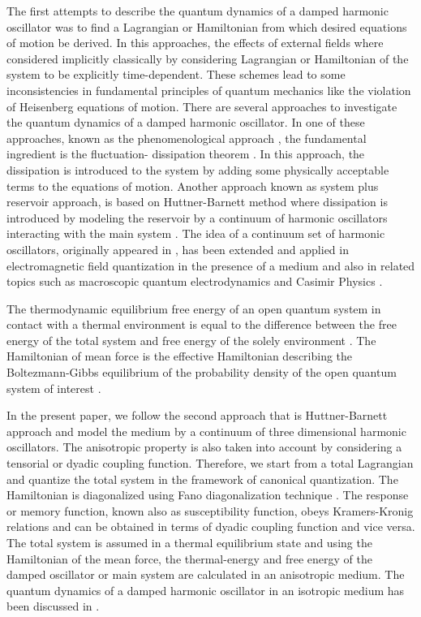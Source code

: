 \documentclass[preprint,showpacs,showkeys,groupedaddress,superscriptaddress]{revtex4}
\begin{document}
The first attempts to describe the quantum dynamics of a damped harmonic oscillator was to find a Lagrangian or Hamiltonian from which desired equations of motion be derived. In this approaches, the effects of external fields where considered implicitly classically by considering Lagrangian or Hamiltonian of the system to be explicitly time-dependent. These schemes lead to some inconsistencies in fundamental principles of quantum mechanics like the violation of Heisenberg equations of motion. There are several approaches to investigate the quantum dynamics of a damped harmonic oscillator. In one of these approaches, known as the phenomenological approach \cite{21-6,23-6,21-m}, the fundamental ingredient is the fluctuation- dissipation theorem \cite{23-m}. In this approach, the dissipation is introduced to the system by adding some physically acceptable terms to the equations of motion. Another approach known as system plus reservoir approach, is based on Huttner-Barnett method where dissipation is introduced by modeling the reservoir by a continuum of harmonic oscillators interacting with the main system \cite{26-6,25-6}. The idea of a continuum set of harmonic oscillators, originally appeared in \cite{25-6}, has been extended and applied in electromagnetic field quantization in the presence of a medium and also in related topics such as macroscopic quantum electrodynamics and Casimir Physics \cite{8,amoo1,phil1,phil2,phil3}.

The thermodynamic equilibrium free energy of an open quantum system in contact with a thermal environment is equal to the difference between the free energy of the total system and free energy of the solely environment \cite{17-2}. The Hamiltonian of mean force is the effective Hamiltonian describing the Boltezmann-Gibbs equilibrium of the probability density of the open quantum system of interest \cite{188}.

In the present paper, we follow the second approach that is Huttner-Barnett approach and model the medium by a continuum of three dimensional harmonic oscillators. The anisotropic property is also taken into account by considering a tensorial or dyadic coupling function. Therefore, we start from a total Lagrangian and quantize the total system in the framework of canonical quantization. The Hamiltonian is diagonalized using Fano diagonalization technique \cite{fano}. The response or memory function, known also as susceptibility function, obeys Kramers-Kronig relations \cite{kk} and can be obtained in terms of dyadic coupling function and vice versa. The total system is assumed in a thermal equilibrium state and using the Hamiltonian of the mean force, the thermal-energy and free energy of the damped oscillator or main system are calculated in an anisotropic medium. The quantum dynamics of a damped harmonic oscillator in an isotropic medium has been discussed in \cite{phil2}.
\end{document}
